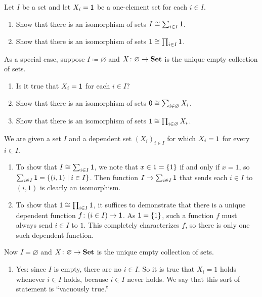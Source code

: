 \documentclass[Book-Poly]{subfiles}
\begin{document}
\begin{exercise}\label{exc.on_sums_prods_sets}
Let $I$ be a set and let $X_i=\textsf{1}$ be a one-element set for each $i\in I$. 
\begin{enumerate}
	\item \label{exc.on_sums_prods_sets.sum} Show that there is an isomorphism of sets $I\cong\sum_{i\in I}\textsf{1}$.
	\item \label{exc.on_sums_prods_sets.prod} Show that there is an isomorphism of sets $\textsf{1}\cong\prod_{i\in I}\textsf{1}$.
\end{enumerate}
As a special case, suppose $I\coloneqq\varnothing$ and $X\colon \varnothing\to\textbf{Set}$ is the unique empty collection of sets.
\begin{enumerate}[resume]
	\item Is it true that $X_i=\textsf{1}$ for each $i\in I$?
	\item Show that there is an isomorphism of sets $\textsf{0}\cong\sum_{i\in\varnothing}X_i$.
	\item Show that there is an isomorphism of sets $\textsf{1}\cong\prod_{i\in\varnothing}X_i$.
\qedhere
\end{enumerate}

\begin{solution}
We are given a set $I$ and a dependent set $(X_i)_{i \in I}$ for which $X_i = \textsf{1}$ for every $i \in I$.
\begin{enumerate}
    \item \label{sol.on_sums_prods_sets.sum}
    To show that $I \cong \sum_{i \in I} \textsf{1}$, we note that $x \in \textsf{1} = \{1\}$ if and only if $x = 1$, so $\sum_{i \in I} \textsf{1} = \{(i, 1) \mid i \in I\}$.
    Then function $I \to \sum_{i \in I} \textsf{1}$ that sends each $i \in I$ to $(i, 1)$ is clearly an isomorphism.
    
    \item \label{sol.on_sums_prods_sets.prod}
    To show that $\textsf{1} \cong \prod_{i \in I} \textsf{1}$, it suffices to demonstrate that there is a unique dependent function $f \colon (i \in I) \to \textsf{1}$.
    As $\textsf{1} = \{1\}$, such a function $f$ must always send $i \in I$ to $1$.
    This completely characterizes $f$, so there is only one such dependent function.
    
\end{enumerate}
Now $I = \varnothing$ and $X \colon \varnothing \to \textbf{Set}$ is the unique empty collection of sets.
\begin{enumerate}[resume]
    \item \label{sol.on_sums_prods_sets.vac} Yes: since $I$ is empty, there are no $i \in I$.
    So it is true that $X_i = 1$ holds whenever $i \in I$ holds, because $i \in I$ never holds. 
    We say that this sort of statement is ``vacuously true.''
    

\end{enumerate}
\end{solution}
\end{exercise}
\end{document}
